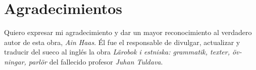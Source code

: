 

\chapter*{Agradecimientos} 

Quiero expresar mi agradecimiento y dar un mayor reconocimiento al verdadero autor de esta obra, \emph{Ain Haas}. Él fue el responsable de divulgar, actualizar y traducir del sueco al inglés la obra \foreignlanguage{swedish}{\emph{Lärobok i estniska: grammatik, texter, övningar, parlör}} del fallecido profesor \emph{Juhan Tuldava}. \\

